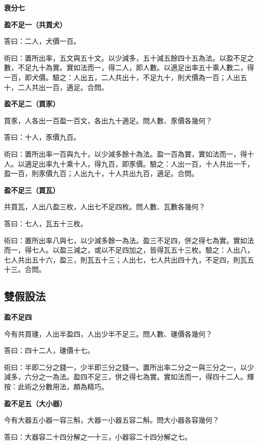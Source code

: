 \documentclass[11pt,a4paper]{article}
\newenvironment{problemenv}[1]{%
  \medskip\noindent\textbf{#1}\par\nopagebreak\smallskip
}{\medskip}
\begin{document}
\begin{problemenv}{衰分七}
\begin{problemenv}{盈不足一（共買犬）}
\textsf{答曰：}二人，犬價一百。

\textsf{術曰：}置所出率，五文與五十文。以少減多，五十減五餘四十五為法。以盈不足之數，不足九十為實。實如法而一，得二人，即人數。以適足出率五十乘人數二，得一百，即犬價。驗之：人出五，二人共出十，不足九十，則犬價為一百；人出五十，二人共出一百，適足。合問。
\end{problemenv}

\begin{problemenv}{盈不足二（買豕）}
買豕，人各出一百盈一百文，各出九十適足。問人數、豕價各幾何？

\textsf{答曰：}十人，豕價九百。

\textsf{術曰：}置所出率一百與九十，以少減多餘十為法。盈一百為實，實如法而一，得十人。以適足出率九十乘十人，得九百，即豕價。驗之：人出一百，十人共出一千，盈一百，則豕價九百；人出九十，十人共出九百，適足。合問。
\end{problemenv}

\begin{problemenv}{盈不足三（買瓦）}
共買瓦，人出八盈三枚，人出七不足四枚。問人數、瓦數各幾何？

\textsf{答曰：}七人，瓦五十三枚。

\textsf{術曰：}置所出率八與七，以少減多餘一為法。盈三不足四，併之得七為實。實如法而一，得七人。以盈三減之，或以不足四加之，皆得瓦五十三枚。驗之：人出八，七人共出五十六，盈三，則瓦五十三；人出七，七人共出四十九，不足四，則瓦五十三。合問。
\end{problemenv}

\subsection{雙假設法}

\begin{problemenv}{盈不足四}
今有共買璡，人出半盈四，人出少半不足三。問人數、璡價各幾何？

\textsf{答曰：}四十二人，璡價十七。

\textsf{術曰：}半即二分之錢一，少半即三分之錢一。置所出率二分之一與三分之一，以少減多，六分之一為法。盈四不足三，併之得七為實。實如法而一，得四十二人。輝按：此術之分數用法，頗為精巧。
\end{problemenv}

\begin{problemenv}{盈不足五（大小器）}
今有大器五小器一容三斛，大器一小器五容二斛。問大小器各容幾何？

\textsf{答曰：}大器容二十四分解之一十三，小器容二十四分解之七。


\end{problemenv}
\end{problemenv}
\end{document}
